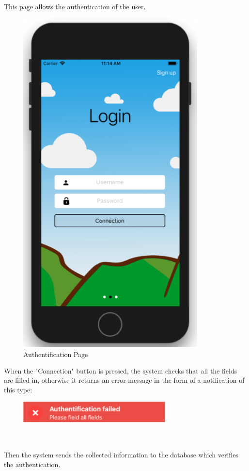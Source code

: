 This page allows the authentication of the user.
\begin{figure}[h!]
\begin{center}
\includegraphics[scale = 0.25]{diagrams/AuthentificationPage.png} 
\end{center}
\caption{Authentification Page}
\end{figure}

\newpage

When the "Connection" button is pressed, the system checks that all the fields are filled in, otherwise it returns an error message in the form of a notification of this type:
\begin{figure}[h!]
\begin{center}
\includegraphics[scale = 0.25]{diagrams/AuthentificationPageFailed.png} 
\end{center}
\end{figure}
\\\\
Then the system sends the collected information to the database which verifies the authentication.

